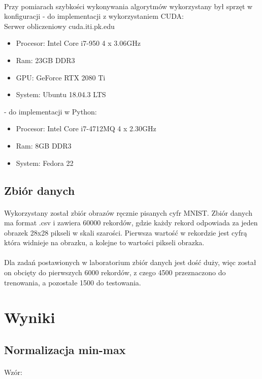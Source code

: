 \documentclass[a4paper,11pt]{article}
\begin{document}
\paragraph{}Przy pomiarach szybkości wykonywania algorytmów wykorzystany był sprzęt w konfiguracji 
- do implementacji z wykorzystaniem CUDA:
\\Serwer obliczeniowy cuda.iti.pk.edu
\begin{itemize}
\item Procesor: Intel Core i7-950 4 x 3.06GHz
\item Ram: 23GB DDR3
\item GPU: GeForce RTX 2080 Ti
\item System: Ubuntu 18.04.3 LTS
\end{itemize}
- do implementacji w Python:
\begin{itemize}
\item Procesor: Intel Core i7-4712MQ 4 x 2.30GHz
\item Ram: 8GB DDR3
\item System: Fedora 22
\
\end{itemize}
\subsection{Zbiór danych} 
\paragraph{}Wykorzystany został zbiór obrazów ręcznie pisanych cyfr MNIST. Zbiór danych ma format .csv i zawiera 60000 rekordów, gdzie każdy rekord odpowiada za jeden obrazek 28x28 pikseli w skali szarości. Pierwsza wartość w rekordzie jest cyfrą która widnieje na obrazku, a kolejne to wartości pikseli obrazka. 
\paragraph{}
Dla zadań postawionych w laboratorium zbiór danych jest dość duży, więc został on obcięty do pierwszych 6000 rekordów, z czego 4500 przeznaczono do trenowania, a pozostałe 1500 do testowania.
\newpage    
\section{Wyniki}   
\subsection{Normalizacja min-max} 
\paragraph{}Wzór:
\end{document}
